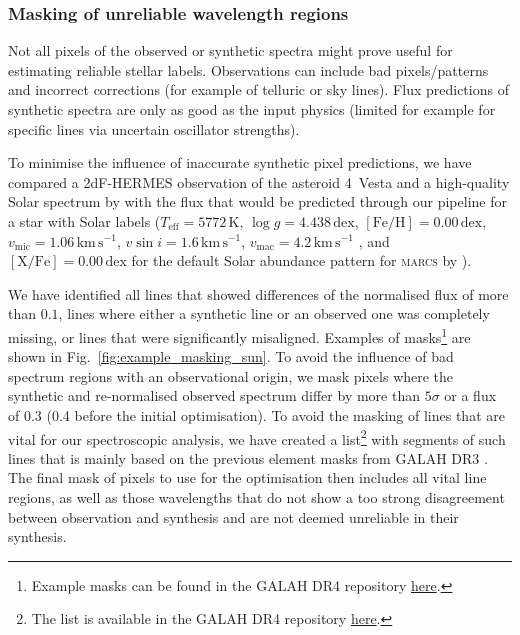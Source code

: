 \documentclass[
  journal=pasa,
  manuscript=research-paper, %
  year=2024,
  volume=37
]{cup-journal}
\newcommand{\marcs}{\textsc{marcs}\xspace}
\newcommand{\dex}{\,\mathrm{dex}}	%
\newcommand{\K}{\,\mathrm{K}}	%
\newcommand{\kms}{\,\mathrm{km\,s^{-1}}}	%
\begin{document}
\subsubsection{Masking of unreliable wavelength regions} \label{sec:masking_of_unreliable_wavelength_regions}

Not all pixels of the observed or synthetic spectra might prove useful for estimating reliable stellar labels. Observations can include bad pixels/patterns and incorrect corrections (for example of telluric or sky lines). Flux predictions of synthetic spectra are only as good as the input physics (limited for example for specific lines via uncertain oscillator strengths).

To minimise the influence of inaccurate synthetic pixel predictions, we have compared a 2dF-HERMES observation of the asteroid 4~Vesta and a high-quality Solar spectrum by \citet{Hinkle2000} with the flux that would be predicted through our pipeline for a star with Solar labels ($T_\text{eff} = 5772\K$, $\log g = 4.438\dex$, $\mathrm{[Fe/H]} = 0.00\dex$, $v_\text{mic} = 1.06\kms$, $v \sin i = 1.6\kms$, $v_\text{mac} = 4.2\kms$ \citep{Prsa2016, Jofre2017}, and $\mathrm{[X/Fe]} = 0.00\dex$ for the default Solar abundance pattern for \marcs by \citet{Grevesse2007}).

We have identified all lines that showed differences of the normalised flux of more than $0.1$, lines where either a synthetic line or an observed one was completely missing, or lines that were significantly misaligned. Examples of masks\footnote{Example masks can be found in the GALAH DR4 repository  \href{https://github.com/svenbuder/GALAH_DR4/blob/main/spectrum_analysis/spectrum_masks}{here}.} are shown in Fig.~\ref{fig:example_masking_sun}. To avoid the influence of bad spectrum regions with an observational origin, we mask pixels where the synthetic and re-normalised observed spectrum differ by more than $5\sigma$ or a flux of 0.3 (0.4 before the initial optimisation). To avoid the masking of lines that are vital for our spectroscopic analysis, we have created a list\footnote{The list is available in the GALAH DR4 repository \href{https://github.com/svenbuder/GALAH_DR4/blob/main/spectrum_analysis/spectrum_masks/vital_lines.fits}{here}.}  with segments of such lines that is mainly based on the previous element masks from GALAH DR3 \citep{Buder2021}. The final mask of pixels to use for the optimisation then includes all vital line regions, as well as those wavelengths that do not show a too strong disagreement between observation and synthesis and are not deemed unreliable in their synthesis.
\end{document}
